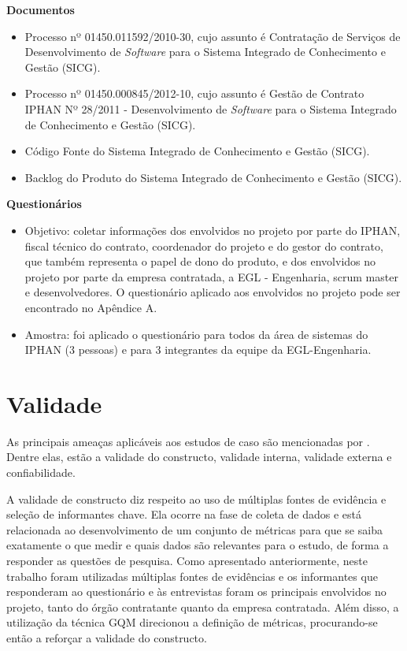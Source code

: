 \textbf{Documentos}
\begin{itemize}
\item Processo nº 01450.011592/2010-30, cujo assunto é Contratação de Serviços de Desenvolvimento de \textit{Software} para o Sistema Integrado de Conhecimento e Gestão (SICG). 
\item Processo nº 01450.000845/2012-10, cujo assunto é Gestão de Contrato IPHAN Nº 28/2011 - Desenvolvimento de \textit{Software} para o Sistema Integrado de Conhecimento e Gestão (SICG). 
\item Código Fonte do Sistema Integrado de Conhecimento e Gestão (SICG).
\item Backlog do Produto do Sistema Integrado de Conhecimento e Gestão (SICG).
\end{itemize}

\textbf{Questionários}
\begin{itemize}
\item Objetivo: coletar informações dos envolvidos no projeto por parte do IPHAN,  fiscal técnico do contrato, coordenador do projeto e do gestor do contrato, que também representa o papel de dono do produto, e dos envolvidos no projeto por parte da empresa contratada, a EGL - Engenharia, scrum master e desenvolvedores. O questionário aplicado aos envolvidos no projeto pode ser encontrado no Apêndice A.
\item Amostra: foi aplicado o questionário para todos da área de sistemas do IPHAN (3 pessoas) e para 3 integrantes da equipe da EGL-Engenharia.
\end{itemize}

\section[Validade]{Validade}

As principais ameaças aplicáveis aos estudos de caso 
são mencionadas por . Dentre elas, estão a validade do constructo, validade interna, validade externa e confiabilidade.

A validade de constructo diz respeito ao uso de múltiplas fontes de evidência e seleção de informantes chave. Ela ocorre na fase de coleta de dados e está relacionada ao desenvolvimento de um conjunto de métricas para que se saiba exatamente o que medir e quais dados são relevantes para o estudo, de forma a responder as questões de pesquisa. Como apresentado anteriormente, neste trabalho foram utilizadas múltiplas fontes de evidências e os informantes que responderam ao questionário e às entrevistas foram os principais envolvidos no projeto, tanto do órgão contratante quanto da empresa contratada. Além disso, a utilização da técnica GQM direcionou a definição de métricas, procurando-se então a reforçar a validade do constructo.

